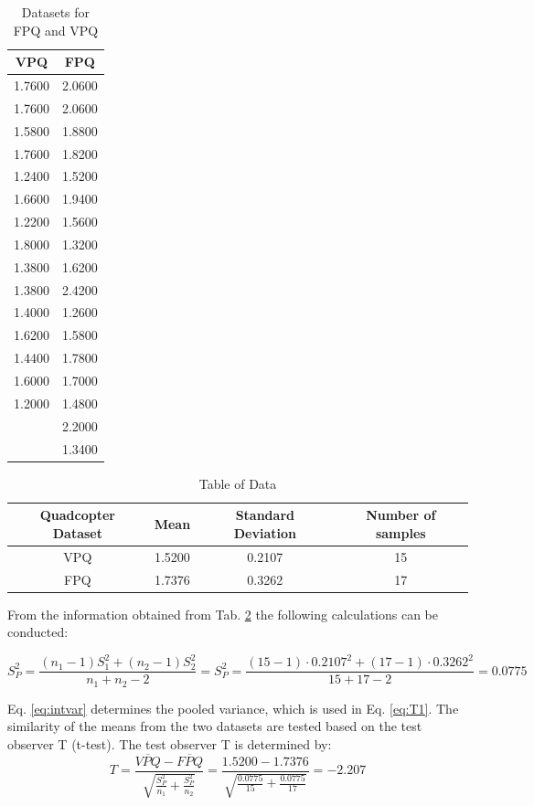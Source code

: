 \begin{table}[H]
\caption{Datasets for FPQ and VPQ}
\label{tab:resp}
\centering
\begin{tabular}{| c | c |} 
 \hline
  VPQ  & FPQ \\
 \hline
 1.7600	&    2.0600  \\
 1.7600	&    2.0600  \\
 1.5800	&    1.8800  \\
 1.7600	&    1.8200  \\
 1.2400	&    1.5200  \\
 1.6600	&    1.9400  \\
 1.2200	&    1.5600  \\
 1.8000	&    1.3200  \\
 1.3800	&    1.6200  \\
 1.3800	&    2.4200  \\
 1.4000	&    1.2600  \\
 1.6200	&    1.5800  \\
 1.4400	&    1.7800  \\
 1.6000	&    1.7000  \\
 1.2000	&    1.4800  \\
    	&    2.2000  \\
	    &    1.3400  \\
\hline
\end{tabular}
\end{table}
\begin{table}[H]
\caption{Table of Data}
\label{tab:infooos}
\centering
\begin{tabular}{| c | c |c| c|} 
  \hline
  Quadcopter Dataset & Mean & Standard Deviation & Number of samples \\
 \hline
 VPQ & 1.5200 & 0.2107   & 15 \\
 FPQ & 1.7376 & 0.3262   & 17\\
 \hline
\end{tabular}
\end{table}

From the information obtained from Tab. \ref{tab:infooos} the following calculations can be conducted:

\begin{equation}
\label{eq:intvar}
S^2_P=\frac{(n_1-1)S^2_1+(n_2-1)S^2_2}{n_1+n_2-2}=S^2_P=\frac{(15-1)\cdot0.2107^2+(17-1)\cdot0.3262^2}{15+17-2}=0.0775
\end{equation}\bigskip

Eq. \ref{eq:intvar} determines the pooled variance, which is used in Eq. \ref{eq:T1}. The similarity of the means from the two datasets are tested based on the test observer T (t-test). The test observer T is determined by:\\
\begin{equation}
\label{eq:T1}
  T = \frac{\overline{VPQ} - \overline{FPQ}}{\sqrt{\frac{S_P^2}{n_1}+\frac{S_P^2}{n_2}}} = \frac{1.5200-1.7376}{\sqrt{ \frac{0.0775}{15}+\frac{0.0775}{17} }} = -2.207
\end{equation}\bigskip

